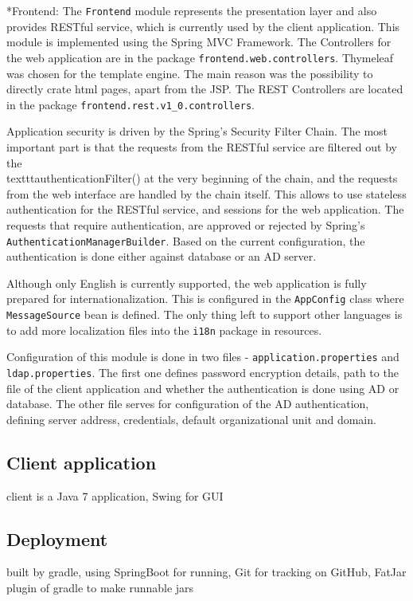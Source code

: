 \documentclass[11pt,singleside]{myfithesis2}
\makeatletter
\renewcommand\paragraph{
   \vspace{-10pt}
   \@startsection{paragraph}{4}{0mm}
      {\baselineskip}
      {- 5pt}
      {\normalfont\normalsize\bfseries}
}
\makeatother
\begin{document}
\paragraph*{Frontend: } The \texttt{Frontend} module represents the presentation layer and also provides RESTful service, which is currently used by the client application. This module is implemented using the Spring MVC Framework. The Controllers for the web application are in the package \texttt{frontend.web.controllers}. Thymeleaf was chosen for the template engine. The main reason was the possibility to directly crate html pages, apart from the JSP. The REST Controllers are located in the package \texttt{frontend.rest.v1\_0.controllers}. 

Application security is driven by the Spring's Security Filter Chain. The most important part is that the requests from the RESTful service are filtered out by the \\texttt{authenticationFilter()} at the very beginning of the chain, and the requests from the web interface are handled by the chain itself. This allows to use stateless authentication for the RESTful service, and sessions for the web application. The requests that require authentication, are approved or rejected by Spring's \texttt{AuthenticationManagerBuilder}. Based on the current configuration, the authentication is done either against database or an AD server.

Although only English is currently supported, the web application is fully prepared for internationalization. This is configured in the \texttt{AppConfig} class where \texttt{MessageSource} bean is defined. The only thing left to support other languages is to add more localization files into the \texttt{i18n} package in resources.

Configuration of this module is done in two files - \texttt{application.properties} and \texttt{ldap.properties}. The first one defines password encryption details, path to the file of the client application and whether the authentication is done using AD or database. The other file serves for configuration of the AD authentication, defining server address, credentials, default organizational unit and domain.

		\subsection{Client application}
client is a Java 7 application, Swing for GUI


		\subsection{Deployment}
built by gradle, using SpringBoot for running, Git for tracking on GitHub, FatJar plugin of gradle to make runnable jars
\end{document}
